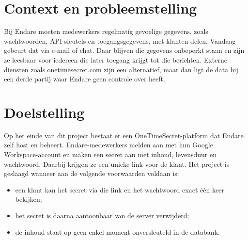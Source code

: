 

\section{Context en probleemstelling}%
\label{vst:context}

Bij Endare moeten medewerkers regelmatig gevoelige gegevens, zoals
wachtwoorden, API-sleutels en toegangsgegevens, met klanten delen. Vandaag
gebeurt dat via e-mail of chat. Daar blijven die gegevens onbeperkt staan en
zijn ze leesbaar voor iedereen die later toegang krijgt tot die berichten.
Externe diensten zoals onetimesecret.com zijn een alternatief, maar dan ligt
de data bij een derde partij waar Endare geen controle over heeft.


\section{Doelstelling}%
\label{vst:doelstelling}

Op het einde van dit project bestaat er een OneTimeSecret-platform dat Endare
zelf host en beheert. Endare-medewerkers melden aan met hun Google
Workspace-account en maken een secret aan met inhoud, levensduur en
wachtwoord. Daarbij krijgen ze een unieke link voor de klant. Het project is
geslaagd wanneer aan de volgende voorwaarden voldaan is:
\begin{itemize}
  \item een klant kan het secret via die link en het wachtwoord exact één
        keer bekijken;
  \item het secret is daarna aantoonbaar van de server verwijderd;
  \item de inhoud staat op geen enkel moment onversleuteld in de databank.
\end{itemize}


